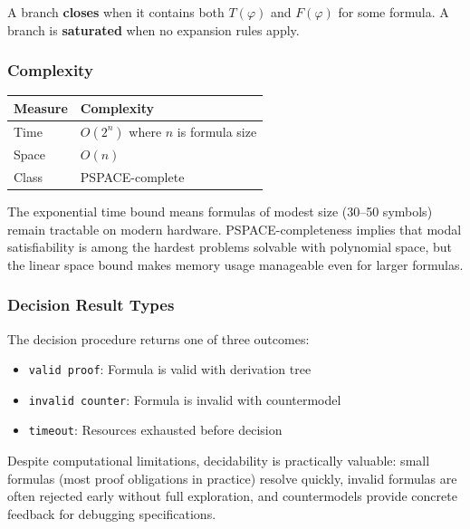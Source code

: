 \documentclass[../BimodalReference.tex]{subfiles}
\begin{document}
\noindent
A branch \textbf{closes} when it contains both $T(\varphi)$ and $F(\varphi)$ for some formula.
A branch is \textbf{saturated} when no expansion rules apply.

\subsubsection{Complexity}

\begin{center}
\begin{tabular}{@{}ll@{}}
\toprule
Measure & Complexity \\
\midrule
Time & $O(2^n)$ where $n$ is formula size \\
Space & $O(n)$ \\
Class & PSPACE-complete \\
\bottomrule
\end{tabular}
\end{center}

The exponential time bound means formulas of modest size (30--50 symbols) remain tractable on modern hardware.
PSPACE-completeness implies that modal satisfiability is among the hardest problems solvable with polynomial space, but the linear space bound makes memory usage manageable even for larger formulas.


\subsubsection{Decision Result Types}

The decision procedure returns one of three outcomes:
\begin{itemize}
  \item \texttt{valid proof}: Formula is valid with derivation tree
  \item \texttt{invalid counter}: Formula is invalid with countermodel
  \item \texttt{timeout}: Resources exhausted before decision
\end{itemize}

Despite computational limitations, decidability is practically valuable: small formulas (most proof obligations in practice) resolve quickly, invalid formulas are often rejected early without full exploration, and countermodels provide concrete feedback for debugging specifications.
\end{document}
